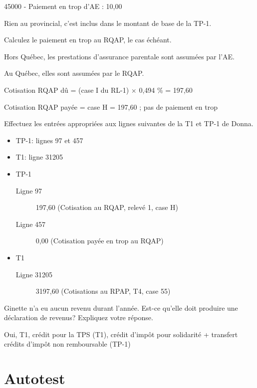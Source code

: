 45000 - Paiement en trop d'AE : 10,00

Rien au provincial, c'est inclus dans le montant de base de la TP-1.

\begin{question}
	Calculez le paiement en trop au RQAP, le cas échéant.
\end{question}
Hors Québec, les prestations d'assurance parentale sont assumées par l'AE.

Au Québec, elles sont assumées par le RQAP.

Cotisation RQAP dû =  (case I du RL-1) $\times$ 0,494 \% = 197,60

Cotisation RQAP payée = case H = 197,60 ; pas de paiement en trop

\begin{question}
	Effectuez les entrées appropriées aux lignes suivantes de la T1 et TP-1 de Donna.
	\begin{itemize}
		\item TP-1: lignes 97 et 457
		\item T1: ligne 31205
	\end{itemize}
\end{question}
\begin{itemize}
	\item TP-1
	\begin{description}
		\item[Ligne 97] 197,60 (Cotisation au RQAP, relevé 1, case H)
		\item[Ligne 457] 0,00 (Cotisation payée en trop au RQAP)
	\end{description}
	\item T1
	\begin{description}
		\item[Ligne 31205] 3197,60 (Cotisations au RPAP, T4, case 55)
	\end{description}
\end{itemize}

\begin{question}
	Ginette n'a eu aucun revenu durant l'année. Est-ce qu'elle doit produire une déclaration de revenus? Expliquez votre réponse.
\end{question}
Oui, T1, crédit pour la TPS (T1), crédit d'impôt pour solidarité + transfert crédits d'impôt non remboursable (TP-1)



\section{Autotest }
